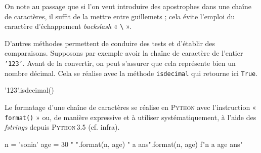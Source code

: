 On note au passage que si l'on veut introduire des apostrophes dans une chaîne de caractères, il suffit de la mettre entre guillemets ; cela évite l'emploi du caractère d'échappement \textit{backslash} « \texttt{\textbackslash} ».

D'autres méthodes permettent de conduire des tests et d'établir des comparaisons. Supposons par exemple avoir la chaîne de caractère de l'entier \texttt{'123'}. Avant de la convertir, on peut s'assurer que cela représente bien un nombre décimal. Cela se réalise avec la méthode \texttt{isdecimal} qui retourne ici \texttt{True}. 

\begin{idleconsole}
	\begin{pyconsole}
		'123'.isdecimal()
	\end{pyconsole}
\end{idleconsole}

Le formatage d'une chaîne de caractères se réalise en \textsc{Python} avec l'instruction « \texttt{format()} » ou, de manière expressive et à utiliser systématiquement, à l'aide des \textit{fstrings} depuis \textsc{Python\,3.5} (cf. infra). 

\begin{idleconsole}
	\begin{pyconsole}
		n = 'sonia'
		age = 30
		"{} {}".format(n, age)
		"{} a {} ans".format(n, age)
		f"{n} a {age} ans"
	\end{pyconsole}
\end{idleconsole}

\vspace{1pt}%


